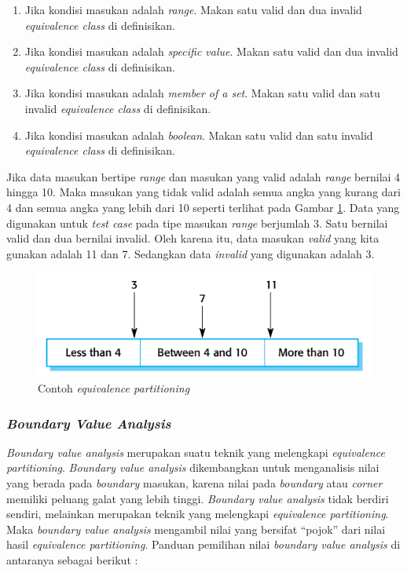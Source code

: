 \begin{enumerate}[
leftmargin=0pt, itemindent=20pt,
labelwidth=15pt, labelsep=5pt, listparindent=0.7cm,
align=left]

\item Jika kondisi masukan adalah \emph{range}. Makan satu valid dan
  dua invalid \emph{equivalence class} di definisikan.
\item Jika kondisi masukan adalah \emph{specific value}. Makan satu valid dan
  dua invalid \emph{equivalence class} di definisikan.
\item Jika kondisi masukan adalah \emph{member of a set}. Makan satu valid dan
  satu invalid \emph{equivalence class} di definisikan.
\item Jika kondisi masukan adalah \emph{boolean}. Makan satu valid dan
  satu invalid \emph{equivalence class} di definisikan.

\end{enumerate}

\newpage

Jika data masukan bertipe \emph{range} dan masukan yang valid adalah
\emph{range} bernilai 4 hingga 10. Maka masukan yang tidak valid
adalah semua angka yang kurang dari 4 dan semua angka yang lebih dari
10 seperti terlihat pada Gambar \ref{fig:contoh-ep-marked}. Data
yang digunakan untuk \emph{test case} pada tipe masukan \emph{range}
berjumlah 3. Satu bernilai valid dan dua bernilai invalid. Oleh karena itu,
data masukan \emph{valid} yang kita gunakan adalah 11 dan 7. Sedangkan
data \emph{invalid} yang digunakan adalah 3.

\begin{figure}[H]
  \centering
  \includegraphics[width=.6\linewidth]{img/contoh-ep-marked}
  \caption{Contoh \emph{equivalence partitioning} \parencite{sommerville2014software}}
  \label{fig:contoh-ep-marked}
\end{figure}

\subsubsection{\emph{Boundary Value Analysis}}

\emph{Boundary value analysis} merupakan suatu teknik yang melengkapi
\emph{equivalence partitioning}. \emph{Boundary value analysis}
dikembangkan untuk menganalisis nilai yang berada pada \emph{boundary}
masukan, karena nilai pada \emph{boundary} atau \emph{corner} memiliki
peluang galat yang lebih tinggi. \emph{Boundary value analysis} tidak
berdiri sendiri, melainkan merupakan teknik yang melengkapi
\emph{equivalence partitioning}. Maka \emph{boundary value analysis}
mengambil nilai yang bersifat ``pojok'' dari nilai hasil
\emph{equivalence partitioning}. Panduan pemilihan nilai
\emph{boundary value analysis} di antaranya sebagai berikut
\parencite{presman2010software}:

